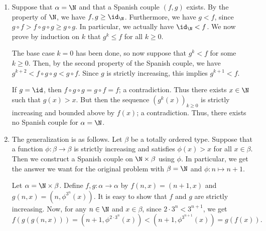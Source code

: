 \begin{enumerate}

    \item
    Suppose that $\alpha = \N$ and that a Spanish couple $(f, g)$ exists.
    By the property of $\N$, we have $f, g \geq \id_{\N}$.
    Furthermore, we have $g < f$, since $g \circ f > f \circ g \circ g \geq g \circ g$.
    In particular, we actually have $\id_{\N} < f$.
    We now prove by induction on $k$ that $g^k \leq f$ for all $k \geq 0$.

    The base case $k = 0$ has been done, so now suppose that $g^k < f$ for some $k \geq 0$.
    Then, by the second property of the Spanish couple, we have $g^{k + 2} < f \circ g \circ g < g \circ f$.
    Since $g$ is strictly increasing, this implies $g^{k + 1} < f$.

    If $g = \id$, then $f \circ g \circ g = g \circ f = f$; a contradiction.
    Thus there exists $x \in \N$ such that $g(x) > x$.
    But then the sequence $(g^k(x))_{k \geq 0}$ is strictly increasing and bounded above by $f(x)$; a contradiction.
    Thus, there exists no Spanish couple for $\alpha = \N$.

    
    
    \item
    The generalization is as follows.
    Let $\beta$ be a totally ordered type.
    Suppose that a function $\phi : \beta \to \beta$ is strictly increasing and satisfies $\phi(x) > x$ for all $x \in \beta$.
    Then we construct a Spanish couple on $\N \times \beta$ using $\phi$.
    In particular, we get the answer we want for the original problem with $\beta = \N$ and $\phi : n \mapsto n + 1$.
    
    Let $\alpha = \N \times \beta$.
    Define $f, g : \alpha \to \alpha$ by $f(n, x) = (n + 1, x)$ and $g(n, x) = (n, \phi^{3^n}(x))$.
    It is easy to show that $f$ and $g$ are strictly increasing.
    Now, for any $n \in \N$ and $x \in \beta$, since $2 \cdot 3^n < 3^{n + 1}$, we get
    \[ f(g(g(n, x))) = (n + 1, \phi^{2 \cdot 3^n}(x)) < (n + 1, \phi^{3^{n + 1}}(x)) = g(f(x)). \]



\end{enumerate}
